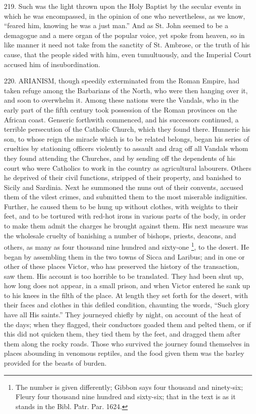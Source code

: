 219.
Such was the light thrown upon the Holy Baptist by the secular events
in which he was encompassed, in the opinion of one who nevertheless,
as we know, ``feared him, knowing he was a just man.'' And as St.
John seemed to be a demagogue and a mere organ of the popular voice,
yet spoke from heaven, so in like manner it need not take from the
sanctity of St. Ambrose, or the truth of his cause, that the people
sided with him, even tumultuously, and the Imperial Court accused him
of insubordination.


220.
ARIANISM, though speedily
exterminated from the Roman Empire, had taken refuge among the
Barbarians of the North, who were then hanging over it, and soon to
overwhelm it. Among these nations were the Vandals, who in the early
part of the fifth century took possession of the Roman provinces on
the African coast. Genseric forthwith commenced, and his successors
continued, a terrible persecution of the Catholic Church, which they
found there. Hunneric his son, to whose reign the miracle which is to
be related belongs, began his series of cruelties by stationing
officers violently to assault and drag off all Vandals whom they found
attending the Churches, and by sending off the dependents of his court
who were Catholics to work in the country as agricultural labourers.
Others he deprived of their civil functions, stripped of their
property, and banished to Sicily and Sardinia. Next he summoned
the nuns out of their convents, accused them of the vilest crimes, and
submitted them to the most miserable indignities. Further, he caused
them to be hung up without clothes, with weights to their feet, and to
be tortured with red-hot irons in various parts of the body, in order
to make them admit the charges he brought against them. His next
measure was the wholesale cruelty of banishing a number of bishops,
priests, deacons, and others, as many as four thousand nine hundred
and sixty-one \footnote{The number is given differently; Gibbon says
four thousand and ninety-six; Fleury four thousand nine hundred and
sixty-six; that in the text is as it stands in the Bibl. Patr. Par.
1624.}, to the
desert. He began by assembling them in the two towns of Sicca and
Laribus; and in one or other of these places Victor, who has preserved
the history of the transaction, saw them. His account is too horrible
to be translated. They had been shut up, how long does not appear, in
a small prison, and when Victor entered he sank up to his knees in the
filth of the place. At length they set forth for the desert, with
their faces and clothes in this defiled condition, chaunting the
words, ``Such glory have all His saints.'' They journeyed chiefly by
night, on account of the heat of the days; when they flagged, their
conductors goaded them and pelted them, or if this did not quicken
them, they tied them by the feet, and dragged them after them along
the rocky roads. Those who survived the journey found themselves
in places abounding in venomous reptiles, and the food given them was
the barley provided for the beasts of burden.

